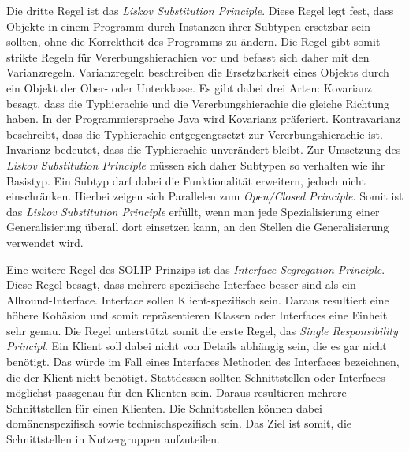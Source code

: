 Die dritte Regel ist das \textit{Liskov Substitution Principle}.
Diese Regel legt fest, dass Objekte in einem Programm durch Instanzen ihrer Subtypen ersetzbar sein sollten, ohne die Korrektheit des Programms zu ändern.
Die Regel gibt somit strikte Regeln für Vererbungshierachien vor und befasst sich daher mit den Varianzregeln.
Varianzregeln beschreiben die Ersetzbarkeit eines Objekts durch ein Objekt der Ober- oder Unterklasse.
Es gibt dabei drei Arten:
Kovarianz besagt, dass die Typhierachie und die Vererbungshierachie die gleiche Richtung haben.
In der Programmiersprache Java wird Kovarianz präferiert.
Kontravarianz beschreibt, dass die Typhierachie entgegengesetzt zur Vererbungshierachie ist.
Invarianz bedeutet, dass die Typhierachie unverändert bleibt.
Zur Umsetzung des \textit{Liskov Substitution Principle} müssen sich daher Subtypen so verhalten wie ihr Basistyp.
Ein Subtyp darf dabei die Funktionalität erweitern, jedoch nicht einschränken.
Hierbei zeigen sich Parallelen zum \textit{Open/Closed Principle}.
Somit ist das \textit{Liskov Substitution Principle} erfüllt, wenn man jede Spezialisierung einer Generalisierung überall dort einsetzen kann, an den Stellen die Generalisierung verwendet wird.

Eine weitere Regel des SOLIP Prinzips ist das \textit{Interface Segregation Principle}.
Diese Regel besagt, dass mehrere spezifische Interface besser sind als ein Allround-Interface.
Interface sollen Klient-spezifisch sein.
Daraus resultiert eine höhere Kohäsion und somit repräsentieren Klassen oder Interfaces eine Einheit sehr genau.
Die Regel unterstützt somit die erste Regel, das \textit{Single Responsibility Principl}.
Ein Klient soll dabei nicht von Details abhängig sein, die es gar nicht benötigt.
Das würde im Fall eines Interfaces Methoden des Interfaces bezeichnen, die der Klient nicht benötigt.
Stattdessen sollten Schnittstellen oder Interfaces möglichst passgenau für den Klienten sein.
Daraus resultieren mehrere Schnittstellen für einen Klienten.
Die Schnittstellen können dabei domänenspezifisch sowie technischspezifisch sein.
Das Ziel ist somit, die Schnittstellen in Nutzergruppen aufzuteilen.

